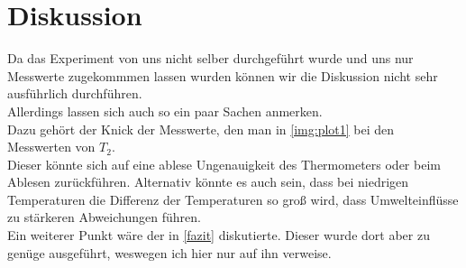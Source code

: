 \section{Diskussion}
Da das Experiment von uns nicht selber durchgeführt wurde und uns nur Messwerte zugekommmen
lassen wurden können wir die Diskussion nicht sehr ausführlich durchführen.\\
Allerdings lassen sich auch so ein paar Sachen anmerken.\\
Dazu gehört der Knick der Messwerte, den man in \ref{img:plot1} bei den Messwerten von $T_2$.\\
Dieser könnte sich auf eine ablese Ungenauigkeit des Thermometers oder beim Ablesen zurückführen.
Alternativ könnte es auch sein, dass bei niedrigen Temperaturen die Differenz der Temperaturen so groß wird, dass 
Umwelteinflüsse zu stärkeren Abweichungen führen.\\
Ein weiterer Punkt wäre der in \ref{fazit} diskutierte. Dieser wurde dort aber zu genüge ausgeführt, weswegen ich hier nur auf ihn verweise.